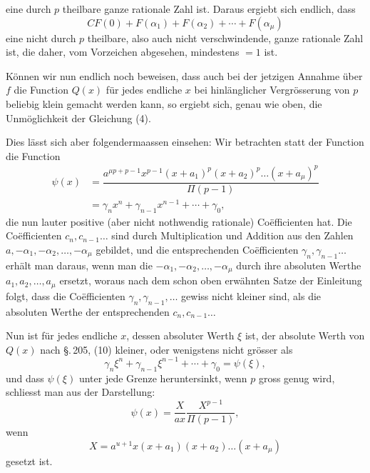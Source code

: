 eine durch $p$ theilbare ganze rationale Zahl ist. Daraus ergiebt sich endlich, dass
\[
CF(0) + F(\alpha_1) + F(\alpha_2) + \cdots + F(\alpha_\mu)
\]
eine nicht durch $p$ theilbare, also auch nicht verschwindende, ganze rationale Zahl ist, die daher, vom Vorzeichen abgesehen, mindestens $=1$ ist.

Können wir nun endlich noch beweisen, dass auch bei der jetzigen Annahme über $f$ die Function $Q(x)$ für jedes endliche $x$ bei hinlänglicher Vergrösserung von $p$ beliebig klein gemacht werden kann, so ergiebt sich, genau wie oben, die Unmöglichkeit der Gleichung (4).

Dies lässt sich aber folgendermaassen einsehen: Wir betrachten statt der Function
die Function
\[
\begin{aligned}
\psi(x) &= \dfrac{a^{\mu p+p-1}x^{p-1}(x+a_1)^p(x+a_2)^p\ldots(x+a_\mu)^p}{\Pi(p-1)} \\
&= \gamma_nx^n + \gamma_{n-1}x^{n-1} + \cdots + \gamma_0,
\end{aligned}
\]
die nun lauter positive (aber nicht nothwendig rationale) Coëfficienten hat. Die Coëfficienten $c_n,c_{n-1}\ldots$ sind durch Multiplication und Addition aus den Zahlen $a,-\alpha_1,-\alpha_2,\ldots,-\alpha_\mu$ gebildet, und die entsprechenden Coëfficienten $\gamma_n,\gamma_{n-1}\ldots$ erhält man daraus, wenn man die $-\alpha_1,-\alpha_2,\ldots,-\alpha_\mu$ durch ihre absoluten Werthe $a_1,a_2,\ldots,a_\mu$ ersetzt, woraus nach dem schon oben erwähnten Satze der Einleitung folgt, dass die Coëfficienten $\gamma_n,\gamma_{n-1},\ldots$ gewiss nicht kleiner sind, als die absoluten Werthe der entsprechenden $c_n,c_{n-1}\ldots$

Nun ist für jedes endliche $x$, dessen absoluter Werth $\xi$ ist, der absolute Werth von $Q(x)$ nach \S.\,205, (10) kleiner, oder wenigstens nicht grösser als
\[
\gamma_n\xi^n + \gamma_{n-1}\xi^{n-1} + \cdots + \gamma_0 = \psi(\xi),
\]
und dass $\psi(\xi)$ unter jede Grenze heruntersinkt, wenn $p$ gross genug wird, schliesst man aus der Darstellung:
\[
\psi(x) = \dfrac{X}{ax}\dfrac{X^{p-1}}{\Pi(p-1)},
\]
wenn
\[
X = a^{u+1}x(x+a_1)(x+a_2)\ldots(x+a_\mu)
\]
gesetzt ist.
